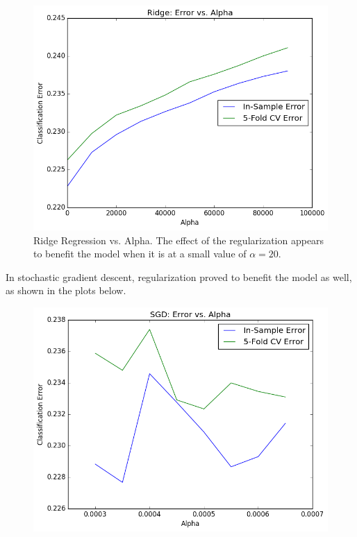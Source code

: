 \begin{itemize}
\begin{itemize}
\begin{figure}[H]
\includegraphics[scale=0.25]{ridge-vs-alpha2}
\caption{Ridge Regression vs. Alpha. The effect of the regularization appears to benefit the model when it is at a small value of $\alpha=20$.}
\end{figure}
In stochastic gradient descent, regularization proved to benefit the model as well, as shown in the plots below.
\begin{figure}[H]
\centering
\includegraphics[scale=0.35]{sgd-vs-alpha}

\end{figure}
\end{itemize}
\end{itemize}

